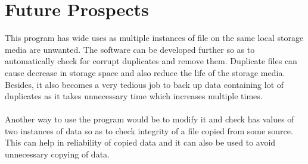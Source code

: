 \chapter{Future Prospects}
This program has wide uses as multiple instances of file on the same local storage media are unwanted. The software can be developed further so as to automatically check for corrupt duplicates and remove them. Duplicate files can cause decrease in storage space and also reduce the life of the storage media.  Besides, it also becomes a very tedious job to back up data containing lot of duplicates as it takes unnecessary time which increases multiple times.
\\~\\
Another way to use the program would be to modify it and check has values of two instances of data so as to check integrity of a file copied from some source. This can help in reliability of copied data and it can also be used to avoid unnecessary copying of data.